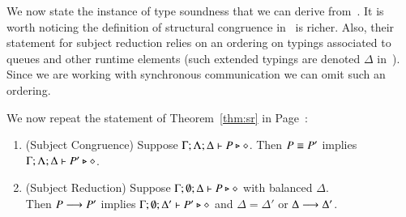 We now state the instance of type soundness that we
can derive from~\cite{MostrousY15}.
It is worth noticing 
the 
definition of structural congruence in~\cite{MostrousY15} is richer. 
Also, their statement for subject reduction relies on an 
ordering on typings associated to queues and other 
runtime elements (such extended typings are denoted $\Delta$ in~\cite{MostrousY15}).
Since we are working with synchronous communication we can omit such an ordering.

We now repeat the statement of
Theorem~\ref{thm:sr} in Page~\pageref{thm:sr}:

\begin{theorem}%
	\begin{enumerate}[1.]
		\item	(Subject Congruence) Suppose $\Gamma; \Lambda; \Delta \vdash P \triangleright \diamond$.
			Then $P \equiv P'$ implies $\Gamma; \Lambda; \Delta \vdash P' \triangleright \diamond$.

		\item	(Subject Reduction) Suppose $\Gamma; \emptyset; \Delta \vdash P \triangleright \diamond$
			with
			balanced $\Delta$. \\
			Then $P \longrightarrow P'$ implies $\Gamma; \emptyset; \Delta'  \vdash P' \triangleright \diamond$
			and $\Delta = \Delta'$ or $\Delta \longrightarrow \Delta'$.

	\end{enumerate}
\end{theorem}


